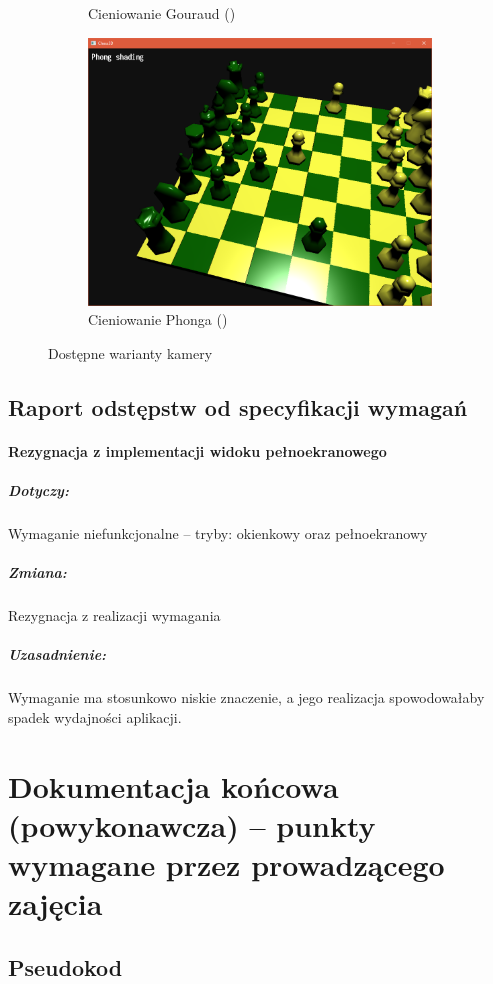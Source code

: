 \documentclass[10pt,a4paper]{article}
\begin{document}
\begin{figure}[H]
\begin{subfigure}[b]{0.3\textwidth}
		\caption{Cieniowanie Gouraud ()}
	\end{subfigure}
	\begin{subfigure}[b]{0.3\textwidth}
		\includegraphics[width=\textwidth]{screenshots/10_phong_shading.png}
		\caption{Cieniowanie Phonga ()}
	\end{subfigure}
	\caption{Dostępne warianty kamery}
\end{figure}

\subsection{Raport odstępstw od specyfikacji wymagań}

\paragraph{Rezygnacja z implementacji widoku pełnoekranowego}
\subparagraph{Dotyczy:} Wymaganie niefunkcjonalne -- tryby: okienkowy oraz pełnoekranowy
\subparagraph{Zmiana:} Rezygnacja z realizacji wymagania
\subparagraph{Uzasadnienie:} Wymaganie ma stosunkowo niskie znaczenie, a jego realizacja spowodowałaby spadek wydajności aplikacji.

\section{Dokumentacja końcowa (powykonawcza) -- punkty wymagane przez prowadzącego zajęcia}

\subsection{Pseudokod}
\end{document}
